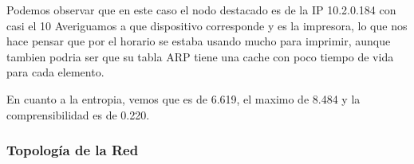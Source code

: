 \begin{figure}[hp!]
	\begin{minipage}[b]{0.9\linewidth}
	\end{minipage}
\end{figure}

Podemos observar que en este caso el nodo destacado es de la IP 10.2.0.184 con casi el 10%
Averiguamos a que dispositivo corresponde y es la impresora, lo que nos hace pensar que
por el horario se estaba usando mucho para imprimir, aunque tambien podria ser
que su tabla ARP tiene una cache con poco tiempo de vida para cada elemento.

En cuanto a la entropia, vemos que es de 6.619, el maximo de 8.484 y la comprensibilidad es
de 0.220.

\subsubsection{Topolog\'ia de la Red}

